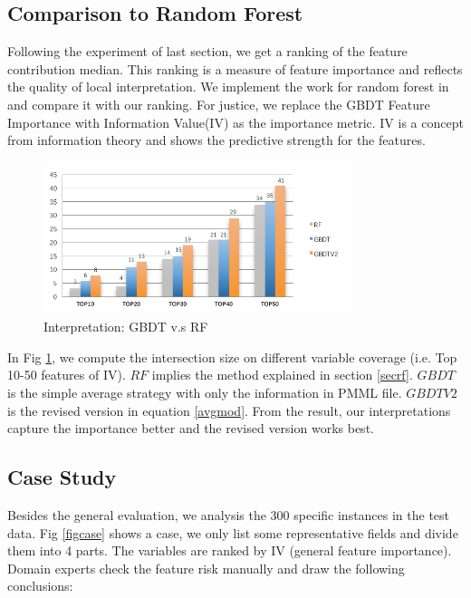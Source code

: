 \subsection{Comparison to Random Forest}
Following the experiment of last section,  we get a ranking of the feature contribution median. This ranking
is a measure of feature importance and reflects the quality of local interpretation.  We implement the work for
random forest in \cite{palczewska2013interpreting} and compare it with our ranking. For justice, we replace
the GBDT Feature Importance with Information Value(IV) as the importance metric. IV is a concept from 
information theory and shows the predictive strength for the features\cite{kullback1997information}. 
\begin{figure}[htbp]
 \centering
 \includegraphics[width=0.8\textwidth]{pic/ivimp.png}
    \caption{Interpretation: GBDT  v.s RF}\label{figiv}
\end{figure}

In Fig \ref{figiv}, we compute the intersection size on different variable coverage (i.e. Top 10-50 features
of IV).  $RF$ implies the method explained in section \ref{secrf}. $GBDT$ is the simple average strategy with
only the information in PMML file. $GBDTV2$ is the revised version in equation \ref{avgmod}. From the result,
our interpretations capture the importance better and the revised version works best.

\subsection{Case Study}
Besides the general evaluation, we analysis the 300 specific instances in the test data. Fig \ref{figcase} shows a case,
we only list some representative fields and divide them into 4 parts. The variables are ranked by IV (general feature
importance). Domain experts check the feature risk manually and draw the following conclusions:

